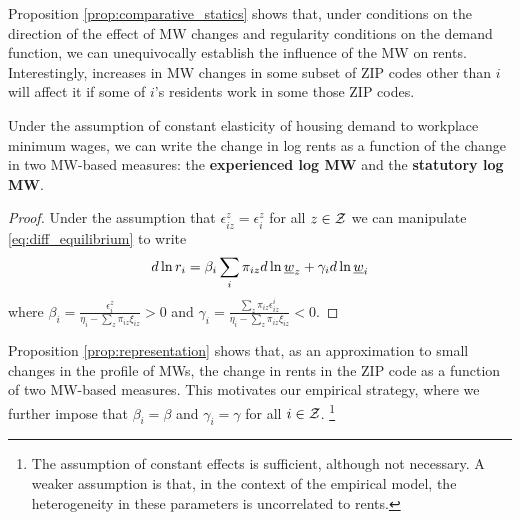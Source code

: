 Proposition \ref{prop:comparative_statics} shows that, under conditions on the 
direction of the effect of MW changes and regularity conditions on the demand 
function, we can unequivocally establish the influence of the MW on rents. 
Interestingly, increases in MW changes in some subset of ZIP codes other than $i$
will affect it if some of $i$'s residents work in some those ZIP codes.

\begin{prop}[Representation]\label{prop:representation}
    Under the assumption of constant elasticity of housing demand to workplace minimum 
    wages, we can write the change in log rents as a function of the change in two 
    MW-based measures: the \textbf{experienced log MW} and the \textbf{statutory 
    log MW}.
\end{prop}
\begin{proof}
    Under the assumption that $\epsilon_{iz}^z = \epsilon_i^z$ for all $z\in\mathcal{Z}$ we can 
    manipulate \eqref{eq:diff_equilibrium} to write
    $$
    d \ln r_i = \beta_i \sum_i \pi_{iz} d\ln \underline{w}_z + \gamma_i d \ln \underline{w}_i
    $$
    where $\beta_i = \frac{\epsilon_{i}^z}{\eta_{i} - \sum_z \pi_{iz} \xi_{iz}} 
    >0$ and $\gamma_i = \frac{\sum_z \pi_{iz} \epsilon_{iz}^i}{\eta_{i} 
            - \sum_z \pi_{iz} \xi_{iz}} < 0$.
\end{proof}

Proposition \ref{prop:representation} shows that, as an approximation to small changes in 
the profile of MWs, the change in rents in the ZIP code as a function of two MW-based 
measures.
This motivates our empirical strategy, where we further impose that $\beta_i = \beta$ and 
$\gamma_i=\gamma$ for all $i\in\mathcal{Z}$.%
\footnote{The assumption of constant effects is sufficient, although not necessary. A 
weaker assumption is that, in the context of the empirical model, the heterogeneity in 
these parameters is uncorrelated to rents.}

